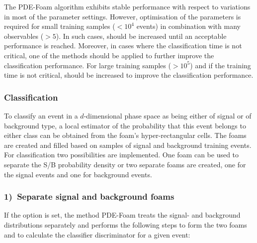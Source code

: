 
The PDE-Foam algorithm exhibits stable performance with respect to variations
in most of the parameter settings. However, optimisation of the parameters is required
for small training samples ($<10^4$ events) in combination with many
observables ($>5$). In such cases,  should be increased until 
an acceptable performance is reached. Moreover, in cases where the classification 
time is not critical, one of the  methods should be applied
to further improve the classification performance. For large training samples ($>10^5$) 
and if the training time is not critical,
 should be increased to improve the classification performance.


\subsubsection{Classification}
\label{sec:PDEFoam-classification}

To classify an event in a $d$-dimensional phase space as being either
of signal or of background type, a local estimator of the probability
that this event belongs to either class can be obtained from the
foam's hyper-rectangular cells. The foams are created and filled based
on samples of signal and background training events.  For
classification two possibilities are implemented. One foam can be used
to separate the S/B probability density or two separate foams are
created, one for the signal events and one for background events.

\subsubsection*{1)~Separate signal and background foams} 

If the option  is set, the
method PDE-Foam treats the signal- and background distributions
separately and performs the following steps to form the two foams and
to calculate the classifier discriminator for a given event:

